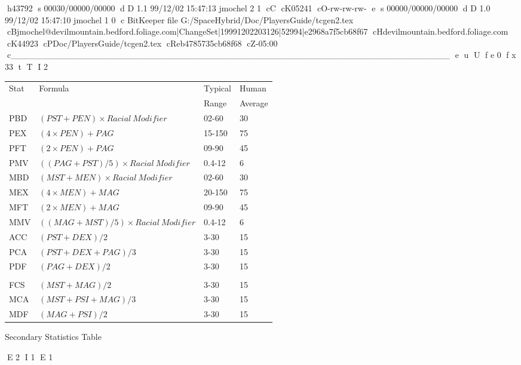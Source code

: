 h43792
s 00030/00000/00000
d D 1.1 99/12/02 15:47:13 jmochel 2 1
cC
cK05241
cO-rw-rw-rw-
e
s 00000/00000/00000
d D 1.0 99/12/02 15:47:10 jmochel 1 0
c BitKeeper file G:/SpaceHybrid/Doc/PlayersGuide/tcgen2.tex
cBjmochel@devilmountain.bedford.foliage.com|ChangeSet|19991202203126|52994|e2968a7f5cb68f67
cHdevilmountain.bedford.foliage.com
cK44923
cPDoc/PlayersGuide/tcgen2.tex
cReb4785735cb68f68
cZ-05:00
c______________________________________________________________________
e
u
U
f e 0
f x 33
t
T
I 2

\begin{SHTable}[h]
	\begin{tabular}{l|l|l|l}
	Stat & Formula										& Typical & Human \\ 
		 &								   				& Range	 & Average \\ 
	\hline
	PBD  & \((PST+PEN) \times {Racial\ Modifier}\)	    & 02-60	 & 30  \\
	PEX  & \((4 \times PEN) + PAG \)		 	        & 15-150 & 75  \\
	PFT  & \((2 \times PEN) +PAG\)			& 09-90 & 45  \\
	PMV  & \(((PAG+PST)/5) \times {Racial\ Modifier}\) & 0.4-12 & 6 \\ 
	\hline
	MBD  & \((MST+MEN) \times {Racial\ Modifier}\)		& 02-60	 & 30 \\
	MEX  & \((4 \times MEN) + MAG \)		& 20-150 & 75  \\
	MFT  & \((2 \times MEN) + MAG \)		& 09-90	 & 45 \\
	MMV  & \(((MAG+MST)/5) \times {Racial\ Modifier}\) & 0.4-12  & 6 \\ 
	\hline
	ACC  & \((PST+DEX)/2	 \)				& 3-30  & 15 \\
	PCA  & \((PST+DEX+PAG)/3 \)				& 3-30  & 15 \\
	PDF  & \((PAG+DEX)/2	 \)				& 3-30  & 15 \\
		 &									&		&	 \\ \hline
	FCS  & \((MST+MAG)/2	 \)				& 3-30  & 15 \\
	MCA  & \((MST+PSI+MAG)/3 \)				& 3-30  & 15 \\
	MDF  & \((MAG+PSI)/2	 \)				& 3-30  & 15 \\
	\end{tabular}
\caption{Secondary Statistics Table}\label{Table:SecondaryStatistics}
\end{SHTable}

E 2
I 1
E 1
